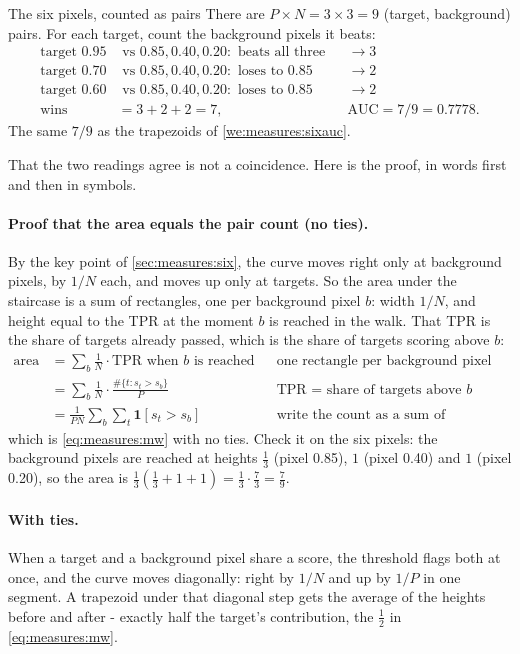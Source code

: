 \begin{worked}[label={we:measures:mw}]{The six pixels, counted as pairs}
There are $P \times N = 3 \times 3 = 9$ (target, background) pairs. For each target, count the background pixels it
beats:
\begin{align*}
\text{target } 0.95 &\text{ vs } 0.85, 0.40, 0.20: \text{ beats all three} &&\to 3\\
\text{target } 0.70 &\text{ vs } 0.85, 0.40, 0.20: \text{ loses to } 0.85 &&\to 2\\
\text{target } 0.60 &\text{ vs } 0.85, 0.40, 0.20: \text{ loses to } 0.85 &&\to 2\\
\text{wins} &= 3 + 2 + 2 = 7, &&\text{AUC} = 7/9 = 0.7778.
\end{align*}
The same $7/9$ as the trapezoids of \cref{we:measures:sixauc}.
\end{worked}

That the two readings agree is not a coincidence. Here is the proof, in words first and then in symbols.

\paragraph{Proof that the area equals the pair count (no ties).} By the key point of \cref{sec:measures:six}, the
curve moves right only at background pixels, by $1/N$ each, and moves up only at targets. So the area under the
staircase is a sum of rectangles, one per background pixel $b$: width $1/N$, and height equal to the TPR at the
moment $b$ is reached in the walk. That TPR is the share of targets already passed, which is the share of targets
scoring above $b$:
\begin{align*}
\text{area} &= \sum_{b} \frac1N \cdot \mathrm{TPR}\text{ when $b$ is reached}
  && \text{one rectangle per background pixel}\\
&= \sum_{b} \frac1N \cdot \frac{\#\{t : s_t > s_b\}}{P}
  && \text{TPR = share of targets above $b$}\\
&= \frac{1}{PN} \sum_b \sum_t \mathbf{1}[s_t > s_b]
  && \text{write the count as a sum of indicators}
\end{align*}
which is \cref{eq:measures:mw} with no ties. Check it on the six pixels: the background pixels are reached at
heights $\frac13$ (pixel 0.85), $1$ (pixel 0.40) and $1$ (pixel 0.20), so the area is
$\frac13(\frac13 + 1 + 1) = \frac13 \cdot \frac73 = \frac79$.

\paragraph{With ties.} When a target and a background pixel share a score, the threshold flags both at once, and
the curve moves diagonally: right by $1/N$ and up by $1/P$ in one segment. A trapezoid under that diagonal step
gets the average of the heights before and after - exactly half the target's contribution, the $\frac12$ in
\cref{eq:measures:mw}.


